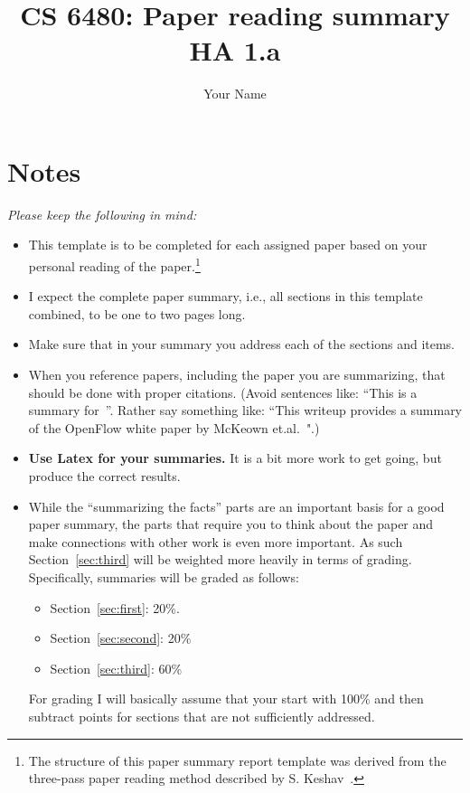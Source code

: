 \documentclass[letterpaper,twocolumn,10pt]{article}
\title{CS 6480: Paper reading summary\\
HA 1.a\\}
\author{Your Name}
\affil{School of Computing, University of Utah}
\begin{document}
\maketitle

\section*{Notes}

{\it 
Please keep the following in mind:

\begin{itemize}

\item This template is to be completed for each assigned paper based on your personal
reading of the paper.\footnote{The structure of this paper summary report template was derived from the 
three-pass paper reading method described by S. Keshav~\cite{how.to.read}.}

\item I expect the complete paper summary, i.e., all sections in this template combined, to be one to two pages long.

\item Make sure that in your summary you address each of the sections and items.

\item When you reference papers, including the paper you are summarizing, that should
be done with proper citations. (Avoid sentences like: ``This is a summary for~\cite{openflow.wp}''.
Rather say something like: ``This writeup provides a summary of the OpenFlow white paper
by McKeown et.al.~\cite{openflow.wp}".)

\item {\bf Use Latex for your summaries.} It is a bit more work to get going, but
produce the correct results.

\item While the ``summarizing the facts'' parts are an important basis for
a good paper summary, the parts that require you to think about the paper
and make connections with other work is even more important. As such
Section~\ref{sec:third} will be weighted more heavily in terms
of grading. Specifically, summaries will be graded as follows:
\begin{itemize}

\item Section~\ref{sec:first}: 20\%.

\item Section~\ref{sec:second}: 20\%

\item Section~\ref{sec:third}: 60\%

\end{itemize}
For grading I will basically assume that your start with 100\% and then subtract
points for sections that are not sufficiently addressed.

\end{itemize}
}
\end{document}
